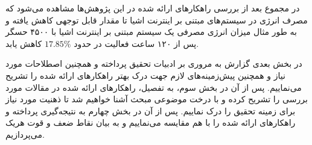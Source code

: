 \par
در مجموع بعد از بررسی راهکارهای ارائه شده در این پژوهش‌ها مشاهده می‌شود که مصرف انرژی در سیستم‌های مبتنی بر اینترنت اشیا تا مقدار قابل توجهی کاهش یافته و به طور مثال میزان انرژی مصرفی یک سیستم مبتنی بر اینترنت اشیا با ۴۵۰۰ حسگر پس از ۱۲۰ ساعت فعالیت در حدود $17.85 \%$ کاهش یابد.

\par
در بخش بعدی گزارش به مروری بر ادبیات تحقیق پرداخته و همچنین اصطلاحات مورد نیاز و همچنین پیش‌زمینه‌های لازم جهت درک بهتر راهکارهای ارائه شده را تشریح می‌نماییم. پس از آن در بخش سوم، به تفصیل، راهکارهای ارائه شده در مقالات مورد بررسی را تشریح کرده و با درخت موضوعی مبحث آشنا خواهیم شد تا ذهنیت مورد نیاز برای زمینه تحقیق را درک نماییم. پس از آن در بخش چهارم به نتیجه‌گیری پرداخته و راهکارهای ارائه شده را با هم مقایسه می‌نماییم و به بیان نقاط ضعف و قوت هریک می‌پردازیم.












